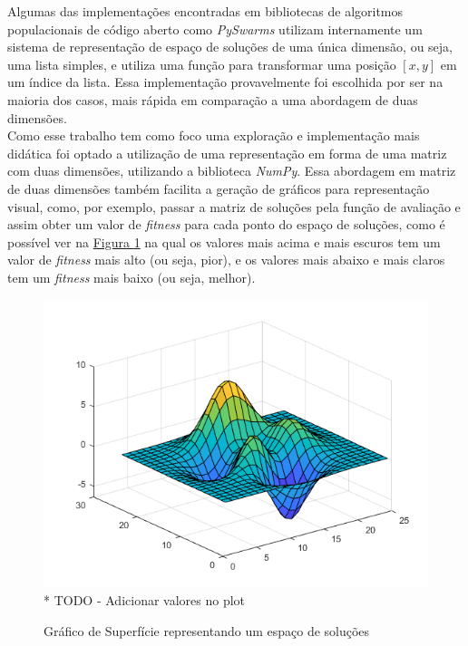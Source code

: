 Algumas das implementações encontradas em bibliotecas de algoritmos populacionais de código aberto como \textit{PySwarms} utilizam internamente um sistema de representação de espaço de soluções de uma única dimensão, ou seja, uma lista simples, e utiliza uma função para transformar uma posição $[x,y]$ em um índice da lista. Essa implementação provavelmente foi escolhida por ser na maioria dos casos, mais rápida em comparação a uma abordagem de duas dimensões.\\
\indent Como esse trabalho tem como foco uma exploração e implementação mais didática foi optado a utilização de uma representação em forma de uma matriz com duas dimensões, utilizando a biblioteca \textit{NumPy}. Essa abordagem em matriz de duas dimensões também facilita a geração de gráficos para representação visual, como, por exemplo, passar a matriz de soluções pela função de avaliação e assim obter um valor de \textit{fitness} para cada ponto do espaço de soluções, como é possível ver na 
\hyperref[fig:surfaceplot]{Figura \ref{fig:surfaceplot}} 
na qual os valores mais acima e mais escuros tem um valor de \textit{fitness} mais alto (ou seja, pior), e os valores mais abaixo e mais claros tem um \textit{fitness} mais baixo (ou seja, melhor).\hfill

\begin{figure}[ht]
    \centering
    \caption{Gráfico de Superfície representando um espaço de soluções}
    \label{fig:surfaceplot}
    \includegraphics[width=\textwidth]{assets/surfaceplot.png}
    \small{* TODO - Adicionar valores no plot}
\end{figure}

